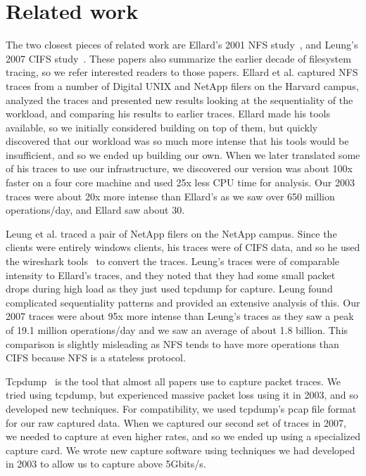 \section{Related work}
\label{sec:related}

The two closest pieces of related work are Ellard's 2001 NFS
study~\cite{EllardFast03}, and Leung's 2007 CIFS
study~\cite{LeungUsenix08}.  These papers also summarize the earlier
decade of filesystem tracing, so we refer interested readers to those
papers.  Ellard et al. captured NFS traces from a number of Digital
UNIX and NetApp filers on the Harvard campus, analyzed the traces and
presented new results looking at the sequentiality of the workload,
and comparing his results to earlier traces.  Ellard made his tools
available, so we initially considered building on top of them, but
quickly discovered that our workload was so much more intense that his
tools would be insufficient, and so we ended up building our own.
When we later translated some of his traces to use our infrastructure, we
discovered our version was about 100x faster on a four core machine and
used 25x less CPU time for analysis.  Our 2003 traces were about 20x
more intense than Ellard's as we saw over 650 million operations/day,
and Ellard saw about 30.

Leung et al. traced a pair of NetApp filers on the NetApp campus.
Since the clients were entirely windows clients, his traces were of
CIFS data, and so he used the wireshark tools~\cite{wireshark} to
convert the traces.  Leung's traces were of comparable intensity to
Ellard's traces, and they noted that they had some small packet drops
during high load as they just used tcpdump for capture.  Leung found
complicated sequentiality patterns and provided an extensive analysis
of this.  Our 2007 traces were about 95x more intense than Leung's
traces as they saw a peak of 19.1 million operations/day and we saw an
average of about 1.8 billion.  This comparison is slightly misleading
as NFS tends to have more operations than CIFS because NFS is a
stateless protocol.

Tcpdump~\cite{tcpdump} is the tool that almost all papers use to capture packet
traces.  We tried using tcpdump, but experienced massive
packet loss using it in 2003, and so developed new techniques.  For
compatibility, we used tcpdump's pcap file format for our raw captured
data.  When we captured our second set of traces in 2007, we needed to
capture at even higher rates, and so we ended up using a
specialized capture card. We wrote new capture software using
techniques we had developed in 2003 to allow us to capture above
5Gbits/s.

